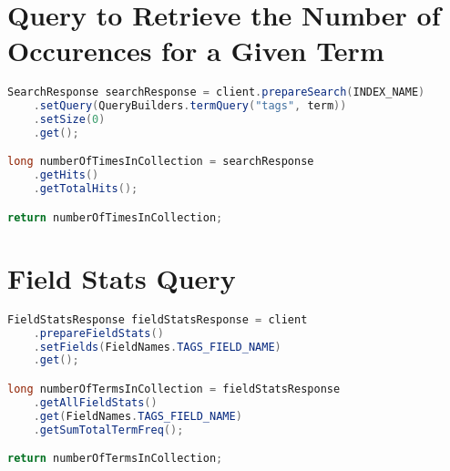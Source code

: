 \section{Query to Retrieve the Number of Occurences for a Given Term}
\begin{lstlisting}[language={java}, caption={Java code used retrieve the number of occurences for a given term in the collection.}, label={ap:number-of-occurences-query}]
SearchResponse searchResponse = client.prepareSearch(INDEX_NAME)
    .setQuery(QueryBuilders.termQuery("tags", term))
    .setSize(0)
    .get();

long numberOfTimesInCollection = searchResponse
    .getHits()
    .getTotalHits();

return numberOfTimesInCollection;
\end{lstlisting}

\section{Field Stats Query}
\begin{lstlisting}[language={java}, caption={Java code used retrieve the total number of terms in a field in the collection.}, label={ap:field-stasts-query}]
FieldStatsResponse fieldStatsResponse = client
    .prepareFieldStats()
    .setFields(FieldNames.TAGS_FIELD_NAME)
    .get();

long numberOfTermsInCollection = fieldStatsResponse
    .getAllFieldStats()
    .get(FieldNames.TAGS_FIELD_NAME)
    .getSumTotalTermFreq();

return numberOfTermsInCollection;
\end{lstlisting}

